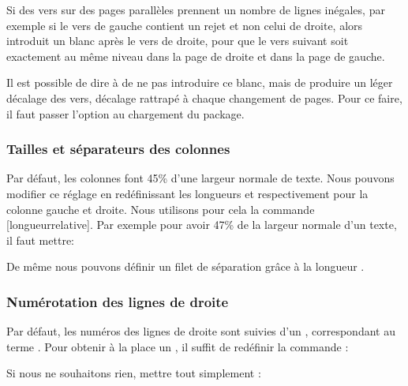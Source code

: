 Si des vers sur des pages parallèles prennent un nombre de lignes inégales, par exemple si le vers de gauche contient un rejet et non  celui de droite, alors  introduit un blanc après le vers de droite, pour que le vers suivant soit exactement au même niveau dans la page de droite et dans la page de gauche.

Il est possible de dire à  de ne pas introduire ce blanc, mais de produire un léger décalage des vers, décalage rattrapé à chaque changement de pages. Pour ce faire, il faut passer l'option  au chargement du package.

\begin{latexcode}
\usepackage[shiftedverses]{reledpar}
\end{latexcode}
 
 \subsubsection{Tailles et séparateurs des colonnes}

Par défaut, les colonnes font 45\% d'une largeur normale de texte. Nous pouvons modifier ce réglage en redéfinissant les longueurs  et  respectivement pour la colonne gauche et droite. Nous utilisons pour cela la commande [longueurrelative]. Par exemple pour avoir 47\% de la largeur normale d'un texte, il faut mettre:

\begin{latexcode}
\setlength{\Lcolwidth}{0.47\textwidth}
\setlength{\Rcolwidth}{0.47\textwidth}
\end{latexcode}

De même nous pouvons définir un filet de séparation grâce à la longueur .

\begin{latexcode}
\setlength{columnrulewidth}{0.4pt}
\end{latexcode}


\subsubsection{Numérotation des lignes de droite}

Par défaut, les numéros des lignes de droite sont suivies d'un , correspondant au terme . Pour obtenir à la place un , il suffit de redéfinir la commande  :

\begin{latexcode}
\renewcommand{\Rlineflag}{D}
\end{latexcode}

Si nous ne souhaitons  rien, mettre tout simplement :


\begin{latexcode}
\renewcommand{\Rlineflag}{}
\end{latexcode}




